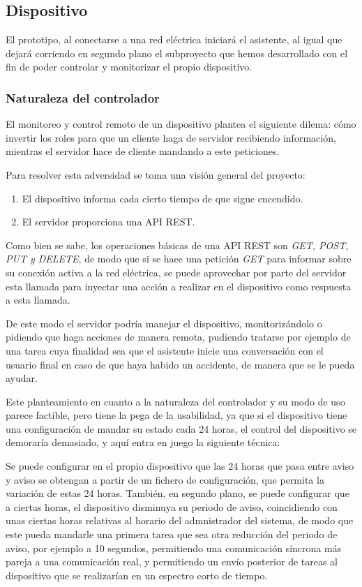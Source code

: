 \subsection{Dispositivo}

El prototipo, al conectarse a una red eléctrica iniciará el asistente, al igual que dejará corriendo en segundo plano el subproyecto que hemos desarrollado con el fin de poder controlar y monitorizar el propio dispositivo.

\subsubsection{Naturaleza del controlador}

El monitoreo y control remoto de un dispositivo plantea el siguiente dilema: cómo invertir los roles para que un cliente haga de servidor recibiendo información, mientras el servidor hace de cliente mandando a este peticiones.

Para resolver esta adversidad se toma una visión general del proyecto:
\begin{enumerate}
    \item El dispositivo informa cada cierto tiempo de que sigue encendido.
    \item El servidor proporciona una API REST.
\end{enumerate}

Como bien se sabe, los operaciones básicas de una API REST son \textit{GET, POST, PUT y DELETE}, de modo que si se hace una petición \textit{GET} para informar sobre su conexión activa a la red eléctrica, se puede aprovechar por parte del servidor esta llamada para inyectar una acción a realizar en el dispositivo como respuesta a esta llamada.

De este modo el servidor podría manejar el dispositivo, monitorizándolo o pidiendo que haga acciones de manera remota, pudiendo tratarse por ejemplo de una tarea cuya finalidad sea que el asistente inicie una conversación con el usuario final en caso de que haya habido un accidente, de manera que se le pueda ayudar.

Este planteamiento en cuanto a la naturaleza del controlador y su modo de uso parece factible, pero tiene la pega de la usabilidad, ya que si el dispositivo tiene una configuración de mandar su estado cada 24 horas, el control del dispositivo se demoraría demasiado, y aquí entra en juego la siguiente técnica:

Se puede configurar en el propio dispositivo que las 24 horas que pasa entre aviso y aviso se obtengan a partir de un fichero de configuración, que permita la variación de estas 24 horas.
También, en segundo plano, se puede configurar que a ciertas horas, el dispositivo disminuya su periodo de aviso, coincidiendo con unas ciertas horas relativas al horario del admnistrador del sistema, de modo que este pueda mandarle una primera tarea que sea otra reducción del periodo de aviso, por ejemplo a 10 segundos, permitiendo una comunicación síncrona más pareja a una comunicación real, y permitiendo un envío posterior de tareas al dispositivo que se realizarían en un espectro corto de tiempo.

